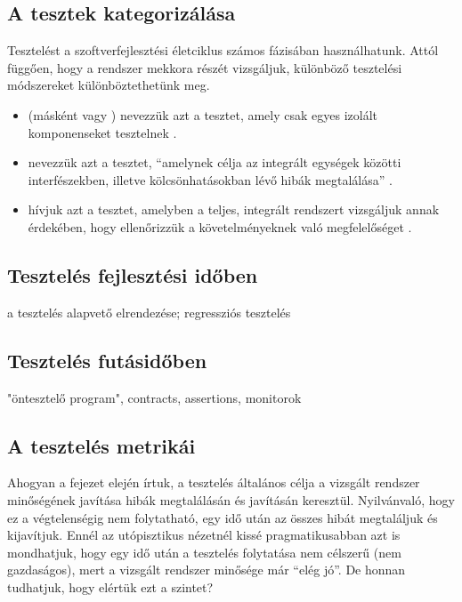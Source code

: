 \subsection{A tesztek kategorizálása}
Tesztelést a szoftverfejlesztési életciklus számos fázisában használhatunk. Attól függően, hogy a rendszer mekkora részét vizsgáljuk, különböző tesztelési módszereket különböztethetünk meg.

\begin{itemize}
\item {} (másként  vagy ) nevezzük azt a tesztet, amely csak egyes izolált komponenseket tesztelnek \cite{HTB-glossary}.
\item {} nevezzük azt a tesztet, ``amelynek célja az integrált egységek közötti
interfészekben, illetve kölcsönhatásokban lévő hibák megtalálása''  \cite{HTB-glossary}.
\item {} hívjuk azt a tesztet, amelyben a teljes, integrált rendszert vizsgáljuk annak érdekében, hogy ellenőrizzük a követelményeknek való megfelelőséget \cite{HTB-glossary}.
\end{itemize}


\subsection{Tesztelés fejlesztési időben}
a tesztelés alapvető elrendezése; regressziós tesztelés

\subsection{Tesztelés futásidőben}
"öntesztelő program", contracts, assertions, monitorok

\subsection{A tesztelés metrikái}
Ahogyan a fejezet elején írtuk, a tesztelés általános célja a vizsgált rendszer minőségének javítása hibák megtalálásán és javításán keresztül. Nyilvánvaló, hogy ez a végtelenségig nem folytatható, egy idő után az összes hibát megtaláljuk és kijavítjuk. Ennél az utópisztikus nézetnél kissé pragmatikusabban azt is mondhatjuk, hogy egy idő után a tesztelés folytatása nem célszerű (nem gazdaságos), mert a vizsgált rendszer minősége már ``elég jó''. %
De honnan tudhatjuk, hogy elértük ezt a szintet?

